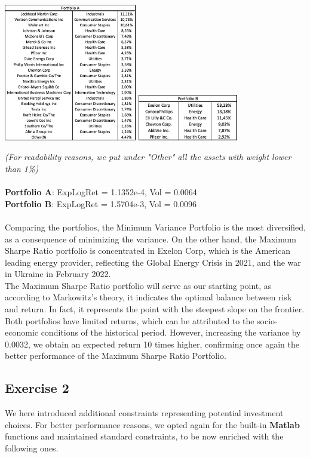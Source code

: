 \documentclass{assignment}
\begin{document}
\begin{center}
    \includegraphics[height=6cm]
    {assets/Port_A.jpg}
    \quad
    \includegraphics[height=2cm]
    {assets/Port_B.jpg}
\end{center}
\textit{(For readability reasons, we put under "Other" all the assets with weight lower than 1\%)}
\\\\
\textbf{Portfolio A}: ExpLogRet = 1.1352e-4, Vol = 0.0064\\
\textbf{Portfolio B}: ExpLogRet = 1.5704e-3, Vol = 0.0096
\\\\
Comparing the portfolios, the Minimum Variance Portfolio is the most diversified, as a consequence
of minimizing the variance. On the other hand, the Maximum Sharpe Ratio portfolio is concentrated
in Exelon Corp, which is the American leading energy provider, reflecting the Global Energy Crisis
in 2021, and the war in Ukraine in February 2022.\\
The Maximum Sharpe Ratio portfolio will serve as our starting point, as according to Markowitz's
theory, it indicates the optimal balance between risk and return. In fact, it represents the point
with the steepest slope on the frontier.\\
Both portfolios have limited returns, which can be attributed to the socio-economic conditions of
the historical period. However, increasing the variance by 0.0032, we obtain an expected return 10
times higher, confirming once again the better performance of the Maximum Sharpe Ratio Portfolio.

\subsection*{Exercise 2}
We here introduced additional constraints representing potential investment choices.
For better performance reasons, we opted again for the built-in \textbf{Matlab} functions and
maintained standard constraints, to be now enriched with the following ones.
\end{document}
